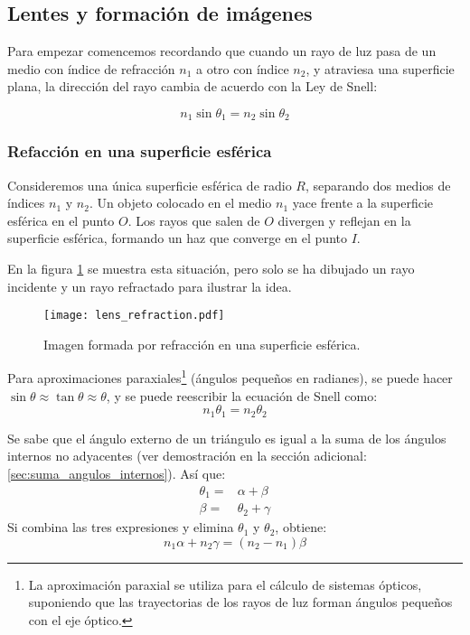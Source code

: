 \subsection{Lentes y formación de imágenes}

Para empezar comencemos recordando que cuando un rayo de luz pasa de un medio con índice de refracción \(n_1\) a otro con índice \(n_2\), y atraviesa una superficie plana, la dirección del rayo cambia de acuerdo con la Ley de Snell:

\[
n_1 \sin \theta_1 = n_2 \sin \theta_2
\]

\subsubsection{Refacción en una superficie esférica}

Consideremos una única superficie esférica de radio \(R\), separando dos medios de índices \(n_1\) y \(n_2\). Un objeto colocado en el medio \(n_1\) yace frente a la superficie esférica en el punto \(O\). Los rayos que salen de \(O\) divergen y reflejan en la superficie esférica, formando un haz que converge en el punto \(I\). 

En la figura \ref{fig:lens_refraction} se muestra esta situación, pero solo se ha dibujado un rayo incidente y un rayo refractado para ilustrar la idea.
\begin{figure}[ht]
  \centering
  \texttt{[image: lens\_refraction.pdf]}
  \caption{Imagen formada por refracción en una superficie esférica.}
  \label{fig:lens_refraction}
\end{figure}

Para aproximaciones paraxiales\footnote{La aproximación paraxial se utiliza para el cálculo de sistemas ópticos, suponiendo que las trayectorias de los rayos de luz forman ángulos pequeños con el eje óptico.} (ángulos pequeños en radianes), se puede hacer \(\sin \theta \approx \tan \theta \approx \theta\), y se puede reescribir la ecuación de Snell como:
\[
  n_1 \theta_1 = n_2 \theta_2
\]

Se sabe que el ángulo externo de un triángulo es igual a la suma de los ángulos internos no adyacentes (ver demostración en la sección adicional: \ref{sec:suma_angulos_internos}). Así que:
\begin{align*}
  \theta_1 =& \alpha + \beta \\
  \beta =& \theta_2 + \gamma
\end{align*}
Si combina las tres expresiones y elimina \(\theta_1\) y \(\theta_2\), obtiene:
\begin{equation}
  n_1 \alpha + n_2 \gamma = (n_2 - n_1) \beta
\end{equation}

